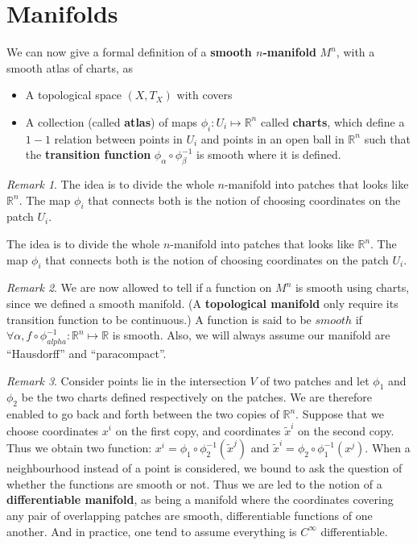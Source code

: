 \documentclass[a4paper,11pt]{article}
\theoremstyle{remark}
\newtheorem{remark}{Remark}[section]
\begin{document}
\section{Manifolds}
\label{s:mani}
We can now give a formal definition of a \textbf{smooth $n$-manifold}
$M^n$, with a smooth atlas of charts, as
\begin{itemize}
\item A topological space $(X, T_X)$ with covers
\item A collection (called \textbf{atlas}) of maps $\phi_i: U_i
  \mapsto \mathbb{R}^n$ called \textbf{charts}, which define a $1-1$
  relation between points in $U_i$ and points in an open ball in
  $\mathbb{R}^n$ such that the \textbf{transition function}
  $\phi_{\alpha}\circ \phi^{-1}_{\beta}$ is smooth where it is
  defined.
\end{itemize}
\begin{remark}The idea is to divide the whole $n$-manifold into
  patches that looks like $\mathbb{R}^n$. The map $\phi_i$ that
  connects both is the notion of choosing coordinates on the patch
  $U_i$.\par
  The idea is to divide the whole $n$-manifold into patches that looks
  like $\mathbb{R}^n$. The map $\phi_i$ that connects both is the
  notion of choosing coordinates on the patch $U_i$.
\end{remark}
\begin{remark}
  We are now allowed to tell if a function on $M^n$ is smooth using
  charts, since we defined a smooth manifold. (A \textbf{topological
    manifold} only require its transition function to be continuous.)
  A function is said to be $smooth$ if $\forall \alpha,
  f\circ\phi_{alpha}^{-1}: \mathbb{R}^n\mapsto\mathbb{R}$ is
  smooth. Also, we will always assume our manifold are ``Hausdorff''
  and ``paracompact''.%
\end{remark}
\begin{remark}
  Consider points lie in the intersection $V$ of two patches and let
  $\phi_1$ and $\phi_2$ be the two charts defined respectively on the
  patches. We are therefore enabled to go back and forth between the
  two copies of $\mathbb{R}^n$. Suppose that we choose coordinates
  $x^i$ on the first copy, and coordinates $\tilde{x}^i$ on the second
  copy. Thus we obtain two function: $x^i =
  \phi_1\circ\phi_2^{-1}(\tilde{x}^j)$ and $\tilde{x}^i =
  \phi_2\circ\phi_1^{-1}(x^j)$. When a neighbourhood instead of a
  point is considered, we bound to ask the question of whether the
  functions are smooth or not. Thus we are led to the notion of a
  \textbf{differentiable manifold}, as being a manifold where the
  coordinates covering any pair of overlapping patches are smooth,
  differentiable functions of one another. And in practice, one tend
  to assume everything is $C^{\infty}$ differentiable.
\end{remark}\par
\end{document}
